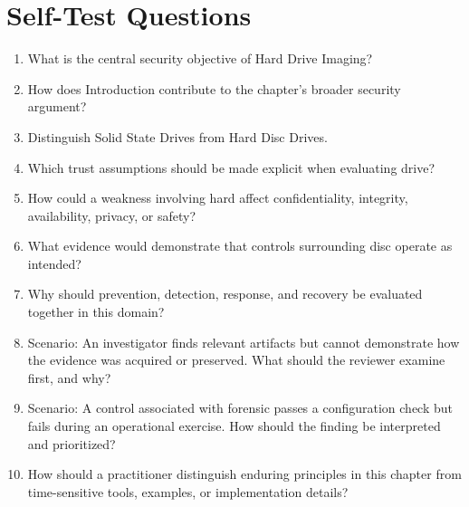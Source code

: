 \documentclass[11pt]{article}
\begin{document}
\section*{Self-Test Questions}
\begin{enumerate}
\item What is the central security objective of Hard Drive Imaging?
\item How does Introduction contribute to the chapter's broader security argument?
\item Distinguish Solid State Drives from Hard Disc Drives.
\item Which trust assumptions should be made explicit when evaluating drive?
\item How could a weakness involving hard affect confidentiality, integrity, availability, privacy, or safety?
\item What evidence would demonstrate that controls surrounding disc operate as intended?
\item Why should prevention, detection, response, and recovery be evaluated together in this domain?
\item Scenario: An investigator finds relevant artifacts but cannot demonstrate how the evidence was acquired or preserved. What should the reviewer examine first, and why?
\item Scenario: A control associated with forensic passes a configuration check but fails during an operational exercise. How should the finding be interpreted and prioritized?
\item How should a practitioner distinguish enduring principles in this chapter from time-sensitive tools, examples, or implementation details?
\end{enumerate}
\end{document}
